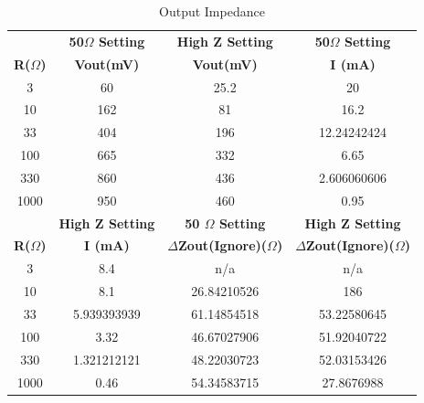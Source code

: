 \documentclass{article}
\begin{document}
\begin{itemize}
        \begin{table}[h]
        \centering
        \caption{Output Impedance}
        \label{my-label}
        \begin{tabular}{cccc}
                      & \textbf{50$\Omega$ Setting}    & \textbf{High Z Setting} & \textbf{50$\Omega$ Setting}    \\ \cline{2-4} 
        \textbf{R($\Omega$)} & \textbf{Vout(mV)}       & \textbf{Vout(mV)}       & \textbf{I (mA)}         \\
        3             & 60                      & 25.2                    & 20                      \\
        10            & 162                     & 81                      & 16.2                    \\
        33            & 404                     & 196                     & 12.24242424             \\
        100           & 665                     & 332                     & 6.65                    \\
        330           & 860                     & 436                     & 2.606060606             \\
        1000          & 950                     & 460                     & 0.95                    \\
                      & \textbf{High Z Setting} & \textbf{50 $\Omega$ Setting}    & \textbf{High Z Setting} \\ \cline{2-4} 
        \textbf{R($\Omega$)}    & \textbf{I (mA)}         & \textbf{$\Delta$Zout(Ignore)($\Omega$)}         & \textbf{$\Delta$Zout(Ignore)($\Omega$)}        \\
        3             & 8.4                     & n/a                     & n/a                     \\
        10            & 8.1                     & 26.84210526             & 186                     \\
        33            & 5.939393939             & 61.14854518             & 53.22580645             \\
        100           & 3.32                    & 46.67027906             & 51.92040722             \\
        330           & 1.321212121             & 48.22030723             & 52.03153426             \\
        1000          & 0.46                    & 54.34583715             & 27.8676988             
        \end{tabular}

\end{table}
\end{itemize}
\end{document}
